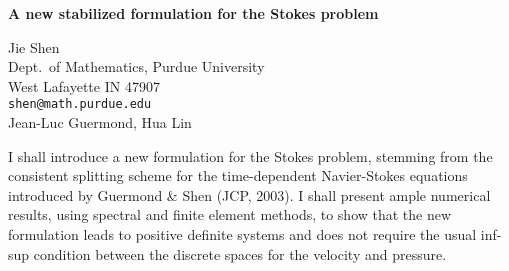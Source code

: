 \documentclass[twosided]{report}
\begin{document}
\begin{center}
{\large			%
{\bf A new stabilized formulation for the Stokes problem}}

	Jie Shen \\
	Dept.~of Mathematics, Purdue University \\
	West Lafayette IN 47907 \\
	{\tt shen@math.purdue.edu} \\
	Jean-Luc Guermond, Hua Lin
\end{center}
I shall introduce a new formulation for the Stokes problem,
stemming from the consistent splitting scheme for the
time-dependent Navier-Stokes equations introduced by
Guermond \& Shen (JCP, 2003). I shall present ample numerical
results, using spectral and finite element methods, to show
that the new formulation leads to positive definite systems
and does not require the usual inf-sup condition between the
discrete spaces for the velocity and pressure.
\end{document}
